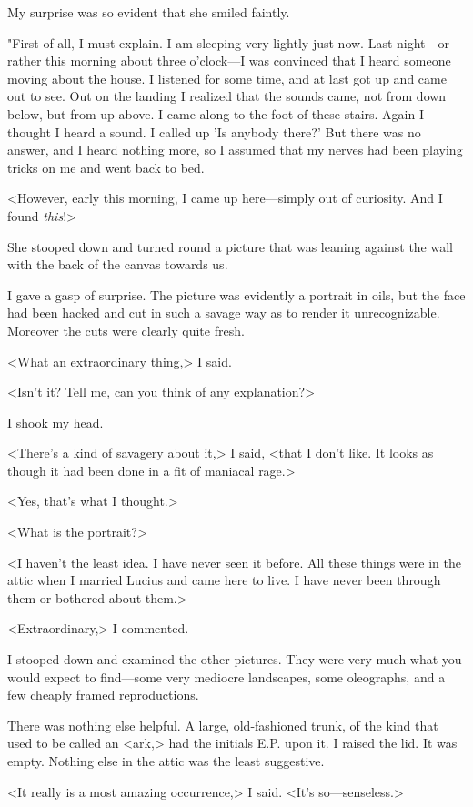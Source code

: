 My surprise was so evident that she smiled faintly.

"First of all, I must explain. I am sleeping very lightly just now. Last night—or rather this morning about three o'clock—I was convinced that I heard someone moving about the house. I listened for some time, and at last got up and came out to see. Out on the landing I realized that the sounds came, not from down below, but from up above. I came along to the foot of these stairs. Again I thought I heard a sound. I called up 'Is anybody there?' But there was no answer, and I heard nothing more, so I assumed that my nerves had been playing tricks on me and went back to bed.

<However, early this morning, I came up here—simply out of curiosity. And I found \emph{this}!>

She stooped down and turned round a picture that was leaning against the wall with the back of the canvas towards us.

I gave a gasp of surprise. The picture was evidently a portrait in oils, but the face had been hacked and cut in such a savage way as to render it unrecognizable. Moreover the cuts were clearly quite fresh.

<What an extraordinary thing,> I said.

<Isn't it? Tell me, can you think of any explanation?>

I shook my head.

<There's a kind of savagery about it,> I said, <that I don't like. It looks as though it had been done in a fit of maniacal rage.>

<Yes, that's what I thought.>

<What is the portrait?>

<I haven't the least idea. I have never seen it before. All these things were in the attic when I married Lucius and came here to live. I have never been through them or bothered about them.>

<Extraordinary,> I commented.

I stooped down and examined the other pictures. They were very much what you would expect to find—some very mediocre landscapes, some oleographs, and a few cheaply framed reproductions.

There was nothing else helpful. A large, old-fashioned trunk, of the kind that used to be called an <ark,> had the initials E.P. upon it. I raised the lid. It was empty. Nothing else in the attic was the least suggestive.

<It really is a most amazing occurrence,> I said. <It's so—senseless.>

